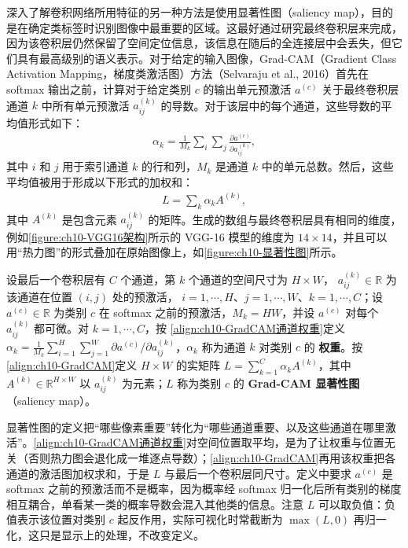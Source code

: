 \documentclass[../../main.tex]{subfiles}
\begin{document}
深入了解卷积网络所用特征的另一种方法是使用显著性图（saliency map），目的是在确定类标签时识别图像中最重要的区域。这最好通过研究最终卷积层来完成，因为该卷积层仍然保留了空间定位信息，该信息在随后的全连接层中会丢失，但它们具有最高级别的语义表示。对于给定的输入图像，Grad-CAM（Gradient Class Activation Mapping，梯度类激活图）方法（Selvaraju et al., 2016）首先在 softmax 输出之前，计算对于给定类别 $c$ 的输出单元预激活 $a^{(c)}$ 关于最终卷积层通道 $k$ 中所有单元预激活 $a_{ij}^{(k)}$ 的导数。对于该层中的每个通道，这些导数的平均值形式如下：
\begin{align}
  \alpha_k = \frac{1}{M_k}\sum_{i}\sum_{j}\frac{\partial a^{(c)}}{\partial a_{ij}^{(k)}},
  \label{align:ch10-GradCAM通道权重}
\end{align}
其中 $i$ 和 $j$ 用于索引通道 $k$ 的行和列，$M_k$ 是通道 $k$ 中的单元总数。然后，这些平均值被用于形成以下形式的加权和：
\begin{align}
  L = \sum_{k}\alpha_k A^{(k)},
  \label{align:ch10-GradCAM}
\end{align}
其中 $A^{(k)}$ 是包含元素 $a_{ij}^{(k)}$ 的矩阵。生成的数组与最终卷积层具有相同的维度，例如\cref{figure:ch10-VGG16架构}所示的 VGG-16 模型的维度为 $14\times 14$，并且可以用“热力图”的形式叠加在原始图像上，如\cref{figure:ch10-显著性图}所示。

\begin{definition}\label{definition:ch10-显著性图}
设最后一个卷积层有 $C$ 个通道，第 $k$ 个通道的空间尺寸为 $H\times W$，
$a_{ij}^{(k)}\in\mathbb{R}$ 为该通道在位置 $(i,j)$ 处的预激活，
$i=1,\cdots,H$、$j=1,\cdots,W$、$k=1,\cdots,C$；设 $a^{(c)}\in\mathbb{R}$ 为类别 $c$ 在
softmax 之前的预激活，$M_k=HW$，并设 $a^{(c)}$ 对每个 $a_{ij}^{(k)}$ 都可微。对
$k=1,\cdots,C$，按
\eqref{align:ch10-GradCAM通道权重}定义
$\alpha_k=\frac{1}{M_k}\sum_{i=1}^{H}\sum_{j=1}^{W}
\partial a^{(c)}/\partial a_{ij}^{(k)}$，$\alpha_k$ 称为通道 $k$ 对类别 $c$ 的
\textbf{权重}。按\eqref{align:ch10-GradCAM}定义 $H\times W$ 的实矩阵
$L=\sum_{k=1}^{C}\alpha_k A^{(k)}$，其中 $A^{(k)}\in\mathbb{R}^{H\times W}$ 以
$a_{ij}^{(k)}$ 为元素；$L$ 称为类别 $c$ 的 \textbf{Grad-CAM 显著性图}
（saliency map）。
\end{definition}

\begin{remark}
显著性图的定义把“哪些像素重要”转化为“哪些通道重要、以及这些通道在哪里激活”。\eqref{align:ch10-GradCAM通道权重}对空间位置取平均，是为了让权重与位置无关（否则热力图会退化成一堆逐点导数）；\eqref{align:ch10-GradCAM}再用该权重把各通道的激活图加权求和，于是 $L$ 与最后一个卷积层同尺寸。定义中要求 $a^{(c)}$ 是 softmax 之前的预激活而不是概率，因为概率经 softmax 归一化后所有类别的梯度相互耦合，单看某一类的概率导数会混入其他类的信息。注意 $L$ 可以取负值：负值表示该位置对类别 $c$ 起反作用，实际可视化时常截断为 $\max(L,0)$ 再归一化，这只是显示上的处理，不改变定义。
\end{remark}
\end{document}

